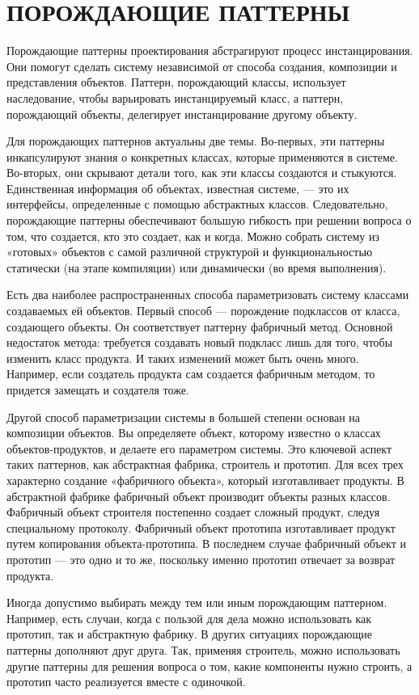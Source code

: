 \section{ПОРОЖДАЮЩИЕ ПАТТЕРНЫ}

Порождающие паттерны проектирования абстрагируют процесс инстанцирования.
Они помогут сделать систему независимой от способа создания, композиции
и представления объектов. Паттерн, порождающий классы, использует наследование,
чтобы варьировать инстанцируемый класс, а паттерн, порождающий объекты,
делегирует инстанцирование другому объекту.

Для порождающих паттернов актуальны две темы. Во-первых, эти паттерны
инкапсулируют знания о конкретных классах, которые применяются в системе.
Во-вторых, они скрывают детали того, как эти классы создаются и стыкуются.
Единственная информация об объектах, известная системе, --- это их интерфейсы,
определенные с помощью абстрактных классов.
Следовательно, порождающие паттерны обеспечивают большую гибкость при решении
вопроса о том, что создается, кто это создает, как и когда.
Можно собрать систему из «готовых» объектов с самой различной структурой и
функциональностью статически (на этапе компиляции) или динамически (во время выполнения).

Есть два наиболее распространенных способа параметризовать систему классами
создаваемых ей объектов. Первый способ --- порождение подклассов от класса,
создающего объекты. Он соответствует паттерну фабричный метод. Основной
недостаток метода: требуется создавать новый подкласс лишь для того, чтобы
изменить класс продукта. И таких изменений может быть очень много. Например,
если создатель продукта сам создается фабричным методом, то придется
замещать и создателя тоже.

Другой способ параметризации системы в большей степени основан на композиции
объектов. Вы определяете объект, которому известно о классах объектов-продуктов,
и делаете его параметром системы. Это ключевой аспект таких
паттернов, как абстрактная фабрика, строитель и прототип. Для всех трех
характерно создание «фабричного объекта», который изготавливает продукты.
В абстрактной фабрике фабричный объект производит объекты разных классов.
Фабричный объект строителя постепенно создает сложный продукт, следуя
специальному протоколу. Фабричный объект прототипа изготавливает продукт путем
копирования объекта-прототипа. В последнем случае фабричный объект
и прототип --- это одно и то же, поскольку именно прототип отвечает за возврат
продукта.

Иногда допустимо выбирать между тем или иным порождающим паттерном.
Например, есть случаи, когда с пользой для дела можно использовать как прототип,
так и абстрактную фабрику. В других ситуациях порождающие паттерны
дополняют друг друга. Так, применяя строитель, можно использовать другие паттерны
для решения вопроса о том, какие компоненты нужно строить, а прототип
часто реализуется вместе с одиночкой.

